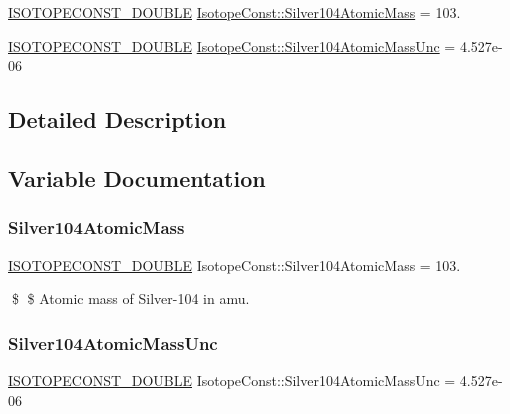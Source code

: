 \begin{DoxyCompactItemize}
\item 
\mbox{\hyperlink{group___isotope_const-_macros_ga8f45a7272ce02c0b4c65c44636ed719a}{I\+S\+O\+T\+O\+P\+E\+C\+O\+N\+S\+T\+\_\+\+D\+O\+U\+B\+LE}} \mbox{\hyperlink{group___isotope_const-_silver-_ag104_ga7bd4e1431afaa9b0848157833cf54330}{Isotope\+Const\+::\+Silver104\+Atomic\+Mass}} = 103.
\item 
\mbox{\hyperlink{group___isotope_const-_macros_ga8f45a7272ce02c0b4c65c44636ed719a}{I\+S\+O\+T\+O\+P\+E\+C\+O\+N\+S\+T\+\_\+\+D\+O\+U\+B\+LE}} \mbox{\hyperlink{group___isotope_const-_silver-_ag104_ga58bec5be4f37f85e54e69b66e8f8e414}{Isotope\+Const\+::\+Silver104\+Atomic\+Mass\+Unc}} = 4.\+527e-\/06
\end{DoxyCompactItemize}


\subsection{Detailed Description}


\subsection{Variable Documentation}
\mbox{\label{group___isotope_const-_silver-_ag104_ga7bd4e1431afaa9b0848157833cf54330}} 
\subsubsection{\texorpdfstring{Silver104\+Atomic\+Mass}{Silver104AtomicMass}}
{\footnotesize\ttfamily \mbox{\hyperlink{group___isotope_const-_macros_ga8f45a7272ce02c0b4c65c44636ed719a}{I\+S\+O\+T\+O\+P\+E\+C\+O\+N\+S\+T\+\_\+\+D\+O\+U\+B\+LE}} Isotope\+Const\+::\+Silver104\+Atomic\+Mass = 103.}

\$ \$ Atomic mass of Silver-\/104 in amu. \mbox{\label{group___isotope_const-_silver-_ag104_ga58bec5be4f37f85e54e69b66e8f8e414}} 
\subsubsection{\texorpdfstring{Silver104\+Atomic\+Mass\+Unc}{Silver104AtomicMassUnc}}
{\footnotesize\ttfamily \mbox{\hyperlink{group___isotope_const-_macros_ga8f45a7272ce02c0b4c65c44636ed719a}{I\+S\+O\+T\+O\+P\+E\+C\+O\+N\+S\+T\+\_\+\+D\+O\+U\+B\+LE}} Isotope\+Const\+::\+Silver104\+Atomic\+Mass\+Unc = 4.\+527e-\/06}

